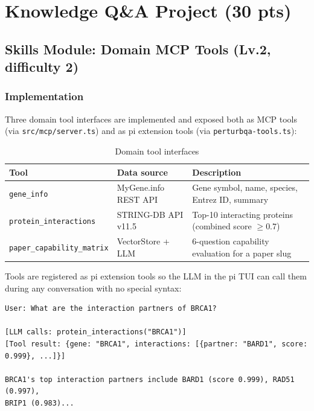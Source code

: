\documentclass[12pt, a4paper]{article}
\begin{document}
\section{Knowledge Q\&A Project (30 pts)}

\subsection{Skills Module: Domain MCP Tools (Lv.2, difficulty 2)}

\subsubsection{Implementation}

Three domain tool interfaces are implemented and exposed both as MCP tools
(via \texttt{src/mcp/server.ts}) and as pi extension tools
(via \texttt{perturbqa-tools.ts}):

\begin{table}[ht]
\centering
\caption{Domain tool interfaces}
\begin{tabularx}{\textwidth}{llX}
\toprule
\textbf{Tool} & \textbf{Data source} & \textbf{Description} \\
\midrule
\texttt{gene\_info}              & MyGene.info REST API  & Gene symbol, name, species, Entrez ID, summary \\
\texttt{protein\_interactions}   & STRING-DB API v11.5   & Top-10 interacting proteins (combined score $\ge 0.7$) \\
\texttt{paper\_capability\_matrix} & VectorStore + LLM   & 6-question capability evaluation for a paper slug \\
\bottomrule
\end{tabularx}
\end{table}

Tools are registered as pi extension tools so the LLM in the pi TUI can call them
during any conversation with no special syntax:

\begin{lstlisting}[caption={Example: pi TUI automatically calls gene\_info}]
User: What are the interaction partners of BRCA1?

[LLM calls: protein_interactions("BRCA1")]
[Tool result: {gene: "BRCA1", interactions: [{partner: "BARD1", score: 0.999}, ...]}]

BRCA1's top interaction partners include BARD1 (score 0.999), RAD51 (0.997),
BRIP1 (0.983)...
\end{lstlisting}
\end{document}
